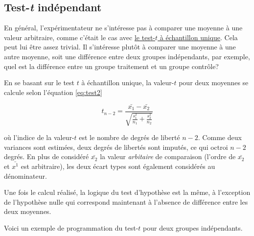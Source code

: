 \documentclass[
]{book}
\begin{document}
\hypertarget{test-t-induxe9pendant}{%
\subsection{\texorpdfstring{Test-\emph{t} indépendant}{Test-t indépendant}}\label{test-t-induxe9pendant}}

En général, l'expérimentateur ne s'intéresse pas à comparer une moyenne à une valeur arbitraire, comme c'était le cas avec \protect\hyperlink{le-test-t-uxe0-uxe9chantillon-unique}{le test-\(t\) à échantillon unique}. Cela peut lui être assez trivial. Il s'intéresse plutôt à comparer une moyenne à une autre moyenne, soit une différence entre deux groupes indépendants, par exemple, quel est la différence entre un groupe traitement et un groupe contrôle?

En se basant sur le test \(t\) à échantillon unique, la valeur-\(t\) pour deux moyennes se calcule selon l'équation \eqref{eq:test2}

\begin{equation}
t_{n-2} = \frac{\bar{x_1}-\bar{x_2}}{\sqrt{\frac{s^2_{1}}{n_1}+\frac{s^2_{2}}{n_2}}}
\label{eq:test2}
\end{equation}

où l'indice de la valeur-\(t\) est le nombre de degrés de liberté \(n-2\). Comme deux variances sont estimées, deux degrés de libertés sont imputés, ce qui octroi \(n-2\) degrés. En plus de considéré \(\bar{x_2}\) la valeur \emph{arbitaire} de comparaison (l'ordre de \(\bar{x_2}\) et \(\bar{x^1}\) est arbitraire), les deux écart types sont également considérés au dénominateur.

Une fois le calcul réalisé, la logique du test d'hypothèse est la même, à l'exception de l'hypothèse nulle qui correspond maintenant à l'absence de différence entre les deux moyennes.

Voici un exemple de programmation du test-\(t\) pour deux groupes indépendants.
\end{document}
